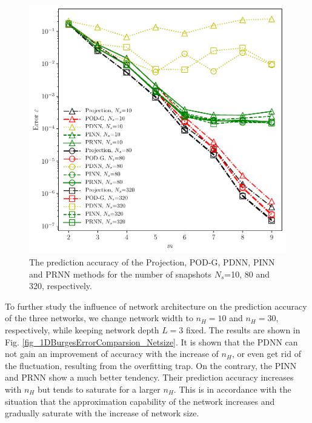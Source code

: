 \documentclass[preprint, 10pt]{elsarticle}
\begin{document}

\begin{figure}[!ht]
  \centering
  \includegraphics[width=12cm]{../../pythonNN/1DBurges/fig/ErrorComparsion_SampleNum.pdf}
\caption{The prediction accuracy of the Projection, POD-G, PDNN, PINN and PRNN methods for the number of snapshots $N_s$=10, 80 and 320, respectively.}
\label{fig_1DBurgesErrorComparsion_SampleNum}
\end{figure}


To further study the influence of network architecture on the prediction accuracy of the three networks, we change network width to $n_H=10$ and $n_H=30$, respectively, while keeping network depth $L=3$ fixed. The results are shown in Fig. \ref{fig_1DBurgesErrorComparsion_Netsize}. It is shown that the PDNN can not gain an improvement of accuracy with the increase of $n_H$, or even get rid of the fluctuation, resulting from the overfitting trap. On the contrary, the PINN and PRNN show a much better tendency. Their prediction accuracy increases with $n_H$ but tends to saturate for a larger $n_H$. This is in accordance with the situation that the approximation capability of the network increases and gradually saturate with the increase of network size.
\end{document}
